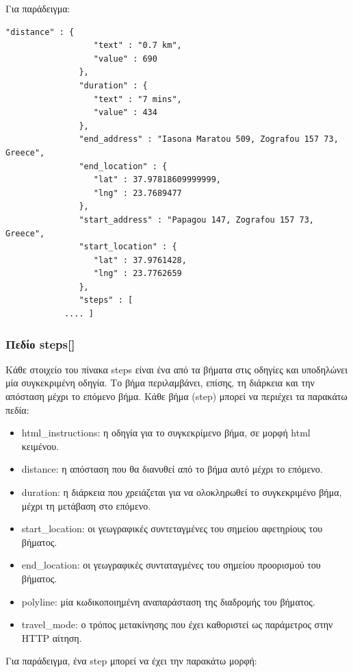 Για παράδειγμα:

\begin{lstlisting}[basicstyle=\footnotesize\ttfamily, breaklines=true]
	      "distance" : {
                  "text" : "0.7 km",
                  "value" : 690
               },
               "duration" : {
                  "text" : "7 mins",
                  "value" : 434
               },
               "end_address" : "Iasona Maratou 509, Zografou 157 73, Greece",
               "end_location" : {
                  "lat" : 37.97818609999999,
                  "lng" : 23.7689477
               },
               "start_address" : "Papagou 147, Zografou 157 73, Greece",
               "start_location" : {
                  "lat" : 37.9761428,
                  "lng" : 23.7762659
               },
               "steps" : [
		    .... ]
\end{lstlisting}


\subsubsection{Πεδίο steps[]}

Κάθε στοιχείο του πίνακα steps είναι ένα από τα βήματα στις οδηγίες και υποδηλώνει μία συγκεκριμένη οδηγία. Το βήμα περιλαμβάνει, επίσης, τη διάρκεια και την απόσταση 
μέχρι το επόμενο βήμα. Κάθε βήμα (step) μπορεί να περιέχει τα παρακάτω πεδία: 

\begin{itemize}
 \item html\_instructions: η οδηγία για το συγκεκρίμενο βήμα, σε μορφή html κειμένου. 
 \item distance: η απόσταση που θα διανυθεί από το βήμα αυτό μέχρι το επόμενο.
 \item duration: η διάρκεια που χρειάζεται για να ολοκληρωθεί το συγκεκριμένο βήμα, μέχρι τη μετάβαση στο επόμενο.
 \item start\_location: οι γεωγραφικές συντεταγμένες του σημείου αφετηρίους του βήματος.
 \item end\_location: οι γεωγραφικές συνταταγμένες του σημείου προορισμού του βήματος.
 \item polyline: μία κωδικοποιημένη αναπαράσταση της διαδρομής του βήματος.
 \item travel\_mode: ο τρόπος μετακίνησης που έχει καθοριστεί ως παράμετρος στην HTTP αίτηση.
\end{itemize}

Για παράδειγμα, ένα step μπορεί να έχει την παρακάτω μορφή:


